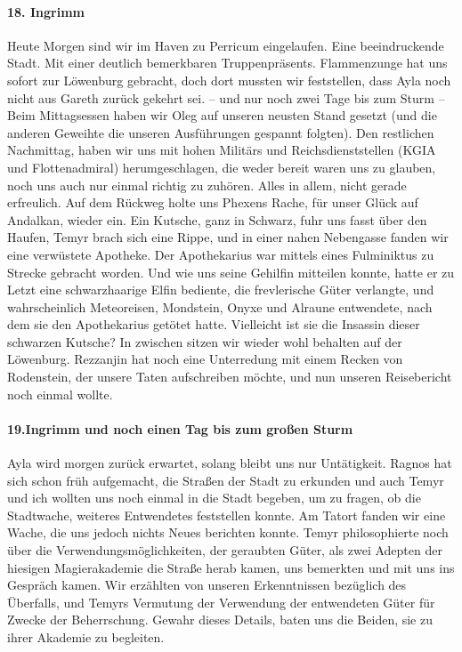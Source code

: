 \paragraph{18. Ingrimm}
Heute Morgen sind wir im Haven zu Perricum eingelaufen. Eine beeindruckende Stadt. Mit einer deutlich bemerkbaren Truppenpräsents.
Flammenzunge hat uns sofort zur Löwenburg gebracht, doch dort mussten wir feststellen, dass Ayla noch nicht aus Gareth zurück gekehrt sei. -- und nur noch zwei Tage bis zum Sturm -- Beim Mittagsessen haben wir Oleg auf unseren neusten Stand gesetzt (und die anderen Geweihte die unseren Ausführungen gespannt folgten). Den restlichen Nachmittag, haben wir uns mit hohen Militärs und Reichsdienststellen (KGIA und Flottenadmiral) herumgeschlagen, die weder bereit waren uns zu glauben, noch uns auch nur einmal richtig zu zuhören. Alles in allem, nicht gerade erfreulich. Auf dem Rückweg holte uns Phexens Rache, für unser Glück auf Andalkan, wieder ein. Ein Kutsche, ganz in Schwarz, fuhr uns fasst über den Haufen, Temyr brach sich eine Rippe, und in einer nahen Nebengasse fanden wir eine verwüstete Apotheke. Der Apothekarius war mittels eines Fulminiktus zu Strecke gebracht worden. Und wie uns seine Gehilfin mitteilen konnte, hatte er zu Letzt eine schwarzhaarige Elfin bediente, die frevlerische Güter verlangte, und wahrscheinlich Meteoreisen, Mondstein, Onyxe und Alraune entwendete, nach dem sie den Apothekarius getötet hatte. Vielleicht ist sie die Insassin dieser schwarzen Kutsche? In zwischen sitzen wir wieder wohl behalten auf der Löwenburg. Rezzanjin hat noch eine Unterredung mit einem Recken von Rodenstein, der unsere Taten aufschreiben möchte, und nun unseren Reisebericht noch einmal wollte.


\paragraph{19.Ingrimm und noch einen Tag bis zum großen Sturm}
Ayla wird morgen zurück erwartet, solang bleibt uns nur Untätigkeit. Ragnos hat sich schon früh aufgemacht, die Straßen der Stadt zu erkunden und auch Temyr und ich wollten uns noch einmal in die Stadt begeben, um zu fragen, ob die Stadtwache, weiteres Entwendetes feststellen konnte. Am Tatort fanden wir eine Wache, die uns jedoch nichts Neues berichten konnte. Temyr philosophierte noch über die Verwendungsmöglichkeiten, der geraubten Güter, als zwei Adepten der hiesigen Magierakademie die Straße herab kamen, uns bemerkten und mit uns ins Gespräch kamen. Wir erzählten von unseren Erkenntnissen bezüglich des Überfalls, und Temyrs Vermutung der Verwendung der entwendeten Güter für Zwecke der Beherrschung. Gewahr dieses Details, baten uns die Beiden, sie zu ihrer Akademie zu begleiten.

